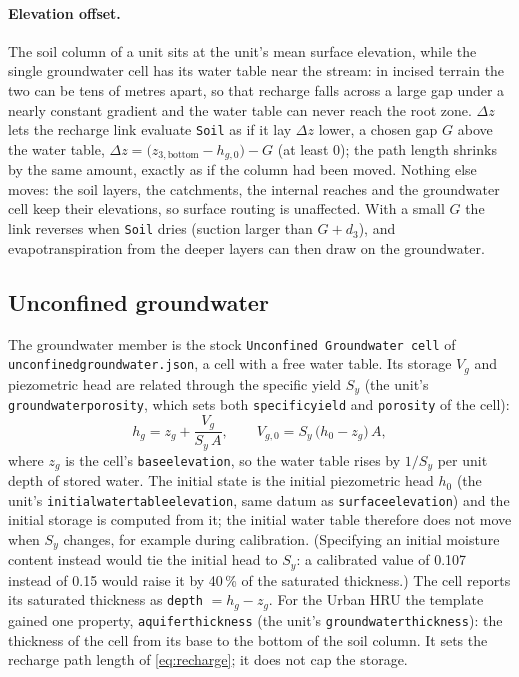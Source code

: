 \documentclass[11pt,a4paper]{article}
\newcommand{\code}[1]{\texttt{\small #1}}
\newcommand{\file}[1]{\texttt{\small #1}}
\renewcommand{\_}{\oldus\allowbreak}   %
\begin{document}
\paragraph{Elevation offset.} The soil column of a unit sits at the unit's mean surface elevation,
while the single groundwater cell has its water table near the stream: in incised terrain the two can
be tens of metres apart, so that recharge falls across a large gap under a nearly constant gradient
and the water table can never reach the root zone. $\Delta z$ lets the recharge link evaluate
\code{Soil\_3} as if it lay $\Delta z$ lower, a chosen gap $G$ above the water table,
$\Delta z = \big(z_{3,\mathrm{bottom}}-h_{g,0}\big)-G$ (at least 0); the path length shrinks by the
same amount, exactly as if the column had been moved. Nothing else moves: the soil layers, the
catchments, the internal reaches and the groundwater cell keep their elevations, so surface routing
is unaffected. With a small $G$ the link reverses when \code{Soil\_3} dries (suction larger than
$G+d_3$), and evapotranspiration from the deeper layers can then draw on the groundwater.

\subsection{Unconfined groundwater}
\label{sec:unconfined}
The groundwater member is the stock \code{Unconfined Groundwater cell} of
\file{unconfined\_groundwater.json}, a cell with a free water table. Its storage $V_g$ and piezometric
head are related through the specific yield $S_y$ (the unit's \code{groundwater\_porosity}, which sets
both \code{specific\_yield} and \code{porosity} of the cell):
\begin{equation}
  h_g = z_g + \frac{V_g}{S_y\,A},\qquad V_{g,0}=S_y\,\big(h_0-z_g\big)\,A,
\end{equation}
where $z_g$ is the cell's \code{base\_elevation}, so the water table rises by $1/S_y$ per unit depth
of stored water. The initial state is the initial piezometric head $h_0$ (the unit's
\code{initial\_water\_table\_elevation}, same datum as \code{surface\_elevation}) and the initial
storage is computed from it; the initial water table therefore does not move when $S_y$ changes, for
example during calibration. (Specifying an initial moisture content instead would tie the initial head
to $S_y$: a calibrated value of 0.107 instead of 0.15 would raise it by 40\,\% of the saturated
thickness.) The cell reports its saturated thickness as \code{depth} $=h_g-z_g$. For the Urban HRU the
template gained one property, \code{aquifer\_thickness} (the unit's \code{groundwater\_thickness}): the
thickness of the cell from its base to the bottom of the soil column. It sets the recharge path
length of \eqref{eq:recharge}; it does not cap the storage.
\end{document}
